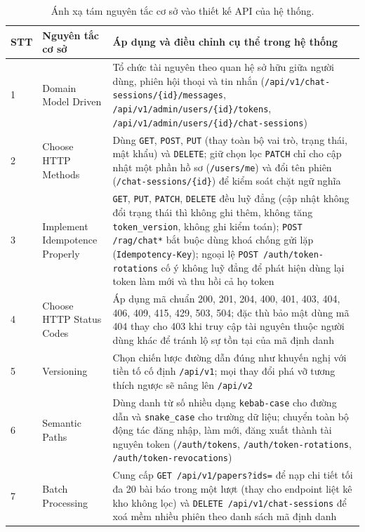 \begin{table}[htbp]
    \centering
    \caption{Ánh xạ tám nguyên tắc cơ sở vào thiết kế API của hệ thống.}
    \label{tab:anh-xa-nguyen-tac-api}
    \small
    \begin{tabularx}{\textwidth}{@{}l>{\raggedright\arraybackslash}p{3.7cm}>{\raggedright\arraybackslash}X@{}}
        \toprule
        \textbf{STT} & \textbf{Nguyên tắc cơ sở} & \textbf{Áp dụng và điều chỉnh cụ thể trong hệ thống} \\
        \midrule
        1 & Domain Model Driven & Tổ chức tài nguyên theo quan hệ sở hữu giữa người dùng, phiên hội thoại và tin nhắn (\texttt{/api/v1/chat-sessions/\{id\}/messages}, \texttt{/api/v1/admin/users/\{id\}/tokens}, \texttt{/api/v1/admin/users/\{id\}/chat-sessions}) \\
        2 & Choose HTTP Methods & Dùng \texttt{GET}, \texttt{POST}, \texttt{PUT} (thay toàn bộ vai trò, trạng thái, mật khẩu) và \texttt{DELETE}; giữ chọn lọc \texttt{PATCH} chỉ cho cập nhật một phần hồ sơ (\texttt{/users/me}) và đổi tên phiên (\texttt{/chat-sessions/\{id\}}) để kiểm soát chặt ngữ nghĩa \\
        3 & Implement Idempotence Properly & \texttt{GET}, \texttt{PUT}, \texttt{PATCH}, \texttt{DELETE} đều luỹ đẳng (cập nhật không đổi trạng thái thì không ghi thêm, không tăng \texttt{token\_version}, không ghi kiểm toán); \texttt{POST /rag/chat*} bắt buộc dùng khoá chống gửi lặp (\texttt{Idempotency-Key}); ngoại lệ \texttt{POST /auth/token-rotations} cố ý không luỹ đẳng để phát hiện dùng lại token làm mới và thu hồi cả họ token \\
        4 & Choose HTTP Status Codes & Áp dụng mã chuẩn 200, 201, 204, 400, 401, 403, 404, 406, 409, 415, 429, 503, 504; đặc thù bảo mật dùng mã 404 thay cho 403 khi truy cập tài nguyên thuộc người dùng khác để tránh lộ sự tồn tại của mã định danh \\
        5 & Versioning & Chọn chiến lược đường dẫn đúng như khuyến nghị với tiền tố cố định \texttt{/api/v1}; mọi thay đổi phá vỡ tương thích ngược sẽ nâng lên \texttt{/api/v2} \\
        6 & Semantic Paths & Dùng danh từ số nhiều dạng \texttt{kebab-case} cho đường dẫn và \texttt{snake\_case} cho trường dữ liệu; chuyển toàn bộ động tác đăng nhập, làm mới, đăng xuất thành tài nguyên token (\texttt{/auth/tokens}, \texttt{/auth/token-rotations}, \texttt{/auth/token-revocations}) \\
        7 & Batch Processing & Cung cấp \texttt{GET /api/v1/papers?ids=} để nạp chi tiết tối đa 20 bài báo trong một lượt (thay cho endpoint liệt kê kho không lọc) và \texttt{DELETE /api/v1/chat-sessions} để xoá mềm nhiều phiên theo danh sách mã định danh \\

\end{tabularx}
\end{table}
